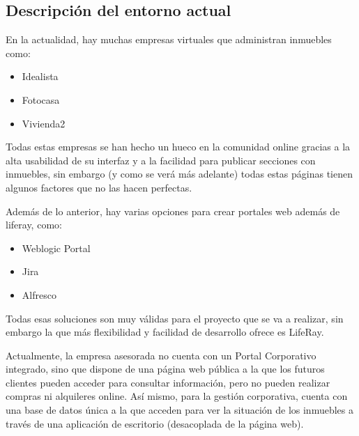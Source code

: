 \subsection{Descripción del entorno actual}
\par En la actualidad, hay muchas empresas virtuales que administran inmuebles como:
\begin{itemize}
	\item Idealista
	\item Fotocasa
	\item Vivienda2
\end{itemize}

\par Todas estas empresas se han hecho un hueco en la comunidad online gracias a la alta usabilidad de su interfaz y a la facilidad para publicar secciones con inmuebles, sin embargo (y como se verá más adelante) todas estas páginas tienen algunos factores que no las hacen perfectas.

\par Además de lo anterior, hay varias opciones para crear portales web además de liferay, como:
\begin{itemize}
	\item Weblogic Portal
	\item Jira
	\item Alfresco
\end{itemize}

\par Todas esas soluciones son muy válidas para el proyecto que se va a realizar, sin embargo la que más flexibilidad y facilidad de desarrollo ofrece es LifeRay.

\par Actualmente, la empresa asesorada no cuenta con un Portal Corporativo integrado, sino que dispone de una página web pública a la que los futuros clientes pueden acceder para consultar información, pero no pueden realizar compras ni alquileres online. Así mismo, para la gestión corporativa, cuenta con una base de datos única a la que acceden para ver la situación de los inmuebles a través de una aplicación de escritorio (desacoplada de la página web).

